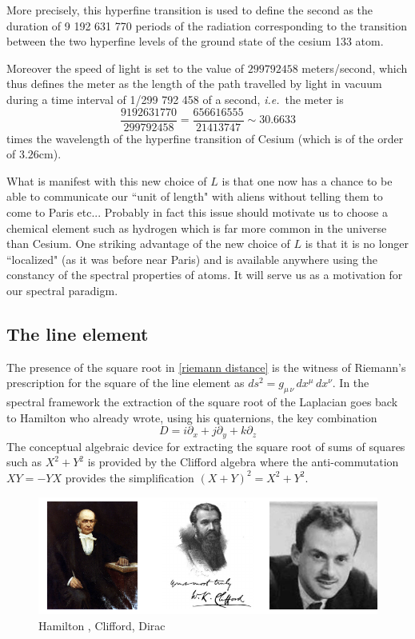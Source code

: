\documentclass[12pt]{article}
\newcommand{\ie}{{\it i.e.\/}\ }
\begin{document}
More precisely, this hyperfine transition  is used to define the second as the duration of 9 192 631 770 periods of the radiation corresponding to the transition between the two hyperfine levels of the ground state of the cesium 133 atom. 

Moreover the speed of light is set to the value of $299792458$ meters/second, which thus defines the meter as the length of the path travelled by light in vacuum during a time interval of 1/299 792 458 of a second, \ie the meter is
$$
\frac{9 192 631 770}{299792458}=\frac{656616555}{21413747}\sim 30.6633 
$$
times the wavelength of the hyperfine transition of Cesium (which is of the order of $3.26 $cm).

What is manifest with this new choice of $L$ is that one now has a chance to be able to communicate our ``unit of length" with aliens without telling them to come to Paris etc... Probably in fact this issue should motivate us to choose a chemical element such as hydrogen which is far more common in the universe than Cesium.
One striking advantage of the new choice of $L$ is that it is no longer ``localized" (as it was before near Paris) and is available anywhere using the constancy of the spectral properties of atoms. It will serve us as a motivation for our spectral paradigm. 

\subsection{The line element}

The presence of the square root in \eqref{riemann distance} is the witness of Riemann's prescription for the square of the line element as $ds^2=g_{\mu\,\nu}\,dx^\mu\,dx^\nu$. In the spectral framework the extraction of the square root of the Laplacian goes back to Hamilton who already wrote, using his quaternions, the key combination $$D=i \partial_x+ j \partial_y+ k \partial_z$$ 
The conceptual algebraic device for extracting the square root of sums of squares such as $X^2+Y^2$ is provided by the Clifford algebra where the anti-commutation
$XY=-YX$ provides the simplification $(X+Y)^2=  X^2+Y^2$.

\begin{figure}[H]
\begin{center}
\includegraphics[scale=1.3]{threeguys.pdf}
\end{center}
\caption{Hamilton \cite{hankins}, Clifford, Dirac \label{dirac} }
\end{figure}
\end{document}
